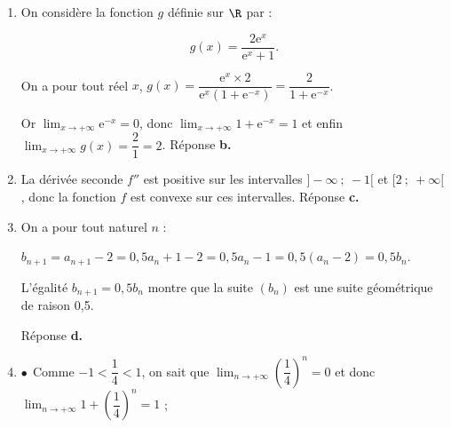\medskip





\medskip

\begin{enumerate}
\item On considère la fonction $g$ définie sur $\R$ par : 

\[ g(x) = \dfrac{2\text{e}^x}{\text{e}^x +1}.\]

\smallskip









On a pour tout réel $x$, \: $g(x) = \dfrac{\text{e}^x \times 2 }{\text{e}^x\left(1 + \text{e}^{-x}\right)} = \dfrac{2}{1 + \text{e}^{-x}}$.

Or $\displaystyle\lim_{x \to + \infty} \text{e}^{-x} = 0$, donc $\displaystyle\lim_{x \to + \infty} 1 + \text{e}^{-x} = 1$ et enfin $\displaystyle\lim_{x \to + \infty} g(x) = \dfrac{2}{1} = 2$. \hfill Réponse \textbf{b.}

\item La dérivée seconde $f''$ est positive sur les intervalles $]- \infty~;~-1[$ et $[2~;~+ \infty[$, donc la fonction $f$ est convexe sur ces intervalles. \hfill Réponse \textbf{c.}

\item 









On a pour tout naturel $n$ :

$b_{n+1} = a_{n+1} - 2 = 0,5a_n + 1 - 2 = 0,5a_n - 1 = 0,5\left(a_n - 2 \right) = 0,5b_n$.

L'égalité $b_{n+1} = 0,5b_n$ montre que la suite $\left(b_n\right)$ est une suite géométrique de raison 0,5. 

\hfill Réponse \textbf{d.}

\item 











$\bullet~~$Comme $- 1 < \dfrac{1}{4} < 1$, on sait que $\displaystyle\lim_{n \to + \infty}\left(\dfrac14\right)^n = 0$ et donc $\displaystyle\lim_{n \to + \infty}1 + \left(\dfrac14\right)^n = 1$ ;


\end{enumerate}
